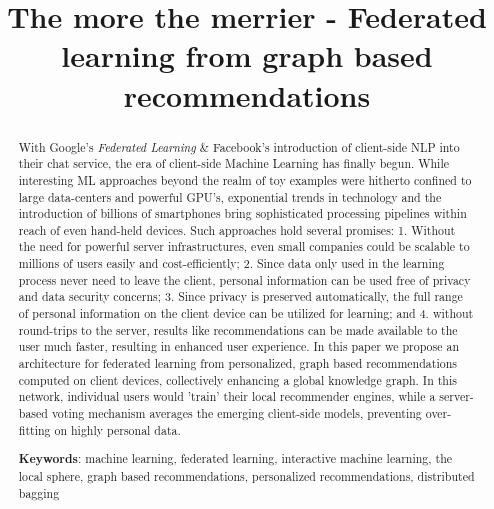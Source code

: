 \documentclass{llncs}
\begin{document}
\title{The more the merrier - Federated learning from graph based recommendations}


	
\maketitle

\begin{abstract}
	
With Google's \textit{Federated Learning} \& Facebook's introduction of client-side NLP into their chat service, the era of client-side Machine Learning has finally begun. While interesting ML approaches beyond the realm of toy examples were hitherto confined to large data-centers and powerful GPU's, exponential trends in technology and the introduction of billions of smartphones bring sophisticated processing pipelines within reach of even hand-held devices. Such approaches hold several promises: 1. Without the need for powerful server infrastructures, even small companies could be scalable to millions of users easily and cost-efficiently; 2. Since data only used in the learning process never need to leave the client, personal information can be used free of privacy and data security concerns; 3. Since privacy is preserved automatically, the full range of personal information on the client device can be utilized for learning; and 4. without round-trips to the server, results like recommendations can be made available to the user much faster, resulting in enhanced user experience. In this paper we propose an architecture for federated learning from personalized, graph based recommendations computed on client devices, collectively enhancing a global knowledge graph. In this network, individual users would 'train' their local recommender engines, while a server-based voting mechanism averages the emerging client-side models, preventing over-fitting on highly personal data.


\medskip

\textbf{Keywords}: machine learning, federated learning, interactive machine learning, the local sphere, graph based recommendations, personalized recommendations, distributed bagging


\end{abstract}
\end{document}
